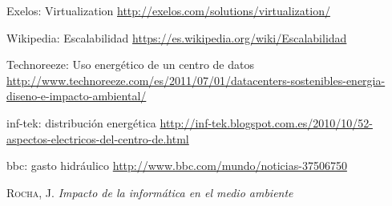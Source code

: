 \documentclass[12pt]{article}
\begin{document}
\begin{thebibliography}{9}
		Exelos: Virtualization \newline
		\url{http://exelos.com/solutions/virtualization/}

		Wikipedia: Escalabilidad \newline
		\url{https://es.wikipedia.org/wiki/Escalabilidad}

		Technoreeze: Uso energético de un centro de datos \newline
		\url{http://www.technoreeze.com/es/2011/07/01/datacenters-sostenibles-energia-diseno-e-impacto-ambiental/}
        
        inf-tek: distribución energética \newline
        \url{http://inf-tek.blogspot.com.es/2010/10/52-aspectos-electricos-del-centro-de.html}
        
        bbc: gasto hidráulico \newline
        \url{http://www.bbc.com/mundo/noticias-37506750}
  
         \textsc{Rocha, J.}
        \textit{Impacto de la informática en el medio ambiente}
        
        
	\end{thebibliography}
\end{document}
